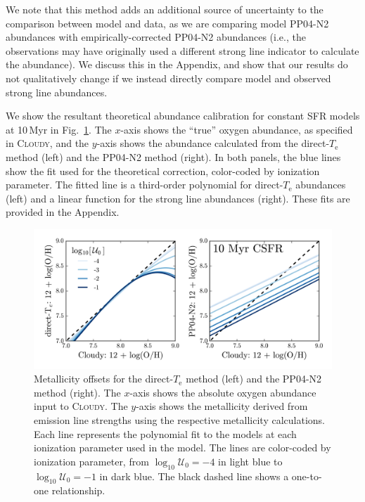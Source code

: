 \documentclass[preprint2]{aastex62}
\newcommand{\Cloudy}{\textsc{Cloudy}\xspace}
\newcommand{\Myr}{$\,$Myr\xspace}
\newcommand{\logten}{\ensuremath{\log_{10}}}
\newcommand{\logUeq}[1]{\ensuremath{\logten \mathcal{U}_0 = #1}}
\newcommand{\Te}{\ensuremath{T_{\mathrm{e}}}\xspace}
\begin{document}
We note that this method adds an additional source of uncertainty to the comparison between model and data, as we are comparing model PP04-N2 abundances with empirically-corrected PP04-N2 abundances (i.e., the observations may have originally used a different strong line indicator to calculate the abundance). We discuss this in the Appendix, and show that our results do not qualitatively change if we instead directly compare model and observed strong line abundances.

We show the resultant theoretical abundance calibration for constant SFR models at 10\Myr in Fig.~\ref{fig:offset}. The $x$-axis shows the ``true'' oxygen abundance, as specified in \Cloudy, and the $y$-axis shows the abundance calculated from the direct-\Te method (left) and the PP04-N2 method (right). In both panels, the blue lines show the fit used for the theoretical correction, color-coded by ionization parameter. The fitted line is a third-order polynomial for direct-\Te abundances (left) and a linear function for the strong line abundances (right). These fits are provided in the Appendix.

\begin{figure}
  \begin{center}
    \includegraphics[width=\linewidth]{figs/f2.png}
    \caption{Metallicity offsets for the direct-\Te method (left) and the PP04-N2 method (right). The $x$-axis shows the absolute oxygen abundance input to \Cloudy. The $y$-axis shows the metallicity derived from emission line strengths using the respective metallicity calculations. Each line represents the polynomial fit to the models at each ionization parameter used in the model. The lines are color-coded by ionization parameter, from \logUeq{-4} in light blue to \logUeq{-1} in dark blue. The black dashed line shows a one-to-one relationship.}
    \label{fig:offset}
  \end{center}
\end{figure}
\end{document}
